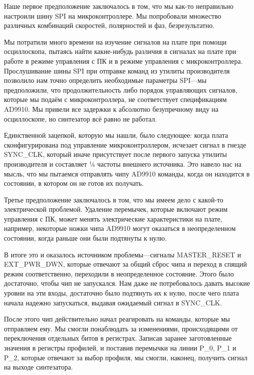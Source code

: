 \documentclass[rusmathsym, eqnumwithinsec, amspack, hyperref]{bomgost}
\begin{document}
Наше первое предположение заключалось в том, что мы как-то неправильно настроили шину SPI на микроконтроллере. Мы попробовали множество различных комбинаций скоростей, полярностей и фаз, безрезультатно.

Мы потратили много времени на изучение сигналов на плате при помощи осциллоскопа, пытаясь найти какие-нибудь различия в сигналах на плате при работе в режиме управления с ПК и в режиме управления с микроконтроллера. Прослушивание шины SPI при отправке команд из утилиты производителя позволило нам точно определить необходимые параметры SPI—мы предположили, что продолжительность либо порядок управляющих сигналов, которые мы подаём с микроконтроллера, не соответствует спецификациям AD9910. Мы привели все задержки к абсолютно безупречному виду на осциллоскопе, но синтезатор всё равно не работал.

Единственной зацепкой, которую мы нашли, было следующее: когда плата сконфигурирована под управление микроконтроллером, исчезает сигнал в гнезде SYNC\_CLK, который иначе присутствует после первого запуска утилиты производителя и составляет ¼ частоты внешнего источника. Это навело нас на мысль, что мы пытаемся отправлять чипу AD9910 команды, когда он находится в состоянии, в котором он не готов их получать.

Третье предположение заключалось в том, что мы имеем дело с какой-то электрической проблемой. Удаление перемычек, которые включают режим управления с ПК, может менять электрические характеристики на плате, например, некоторые ножки чипа AD9910 могут оказаться в неопределенном состоянии, когда раньше они были подтянуты к нулю.

В итоге это и оказалось источником проблемы—сигналы MASTER\_RESET и EXT\_PWR\_DWN, которые отвечают за общий сброс чипа и переход в спящий режим соответственно, переходили в неопределенное состояние. Этого было достаточно, чтобы чип не запускался. Нам даже не потребовалось давать высокие уровни на эти входы, достаточно было подтянуть их к нулю, после чего плата начала надежно запускаться, выдавая ожидаемый сигнал в SYNC\_CLK.

После этого чип действительно начал реагировать на команды, которые мы отправляем ему. Мы смогли понаблюдать за изменениями, происходящими от переключения отдельных битов в регистрах. Записав заранее заготовленные значения в регистры профилей, и поставив перемычки на линии P\_0, P\_1 и P\_2, которые отвечают за выбор профиля, мы смогли, наконец, получить сигнал на выходе синтезатора.
\end{document}

